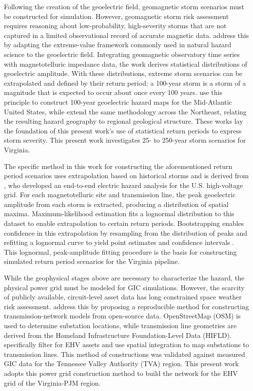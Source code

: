 \documentclass[draft]{agujournal2019}
\begin{document}
Following the creation of the geoelectric field, geomagnetic storm scenarios must be constructed for simulation. However, geomagnetic storm risk assessment requires reasoning about low-probability, high-severity storms that are not captured in a limited observational record of accurate magnetic data.  address this by adapting the extreme-value framework commonly used in natural hazard science to the geoelectric field. Integrating geomagnetic observatory time series with magnetotelluric impedance data, the work derives statistical distributions of geoelectric amplitude. With these distributions, extreme storm scenarios can be extrapolated and defined by their return period: a 100-year storm is a storm of a magnitude that is expected to occur about once every 100 years.  use this principle to construct 100-year geoelectric hazard maps for the Mid-Atlantic United States, while  extend the same methodology across the Northeast, relating the resulting hazard geography to regional geological structure. These works lay the foundation of this present work's use of statistical return periods to express storm severity. This present work investigates 25- to 250-year storm scenarios for Virginia.

The specific method in this work for constructing the aforementioned return period scenarios uses extrapolation based on historical storms and is derived from , who developed an end-to-end electric hazard analysis for the U.S. high-voltage grid. For each magnetotelluric site and transmission line, the peak geoelectric amplitude from each storm is extracted, producing a distribution of spatial maxima. Maximum-likelihood estimation fits a lognormal distribution to this dataset to enable extrapolation to certain return periods. Bootstrapping enables confidence in this extrapolation by resampling from the distribution of peaks and refitting a lognormal curve to yield point estimates and confidence intervals \cite{Love2018}. This lognormal, peak-amplitude fitting procedure is the basis for constructing simulated return period scenarios for the Virginia pipeline. 

While the geophysical stages above are necessary to characterize the hazard, the physical power grid must be modeled for GIC simulations. However, the scarcity of publicly available, circuit-level asset data has long constrained space weather risk assessment.  address this by proposing a reproducible method for constructing transmission-network models from open-source data. OpenStreetMap (OSM) is used to determine substation locations, while transmission line geometries are derived from the Homeland Infrastructure Foundation-Level Data (HIFLD).  specifically filter for EHV assets and use spatial integration to map substations to transmission lines. This method of constructions was validated against measured GIC data for the Tennessee Valley Authority (TVA) region. This present work adopts this power grid construction method to build the network for the EHV grid of the Virginia-PJM region. 
\end{document}
